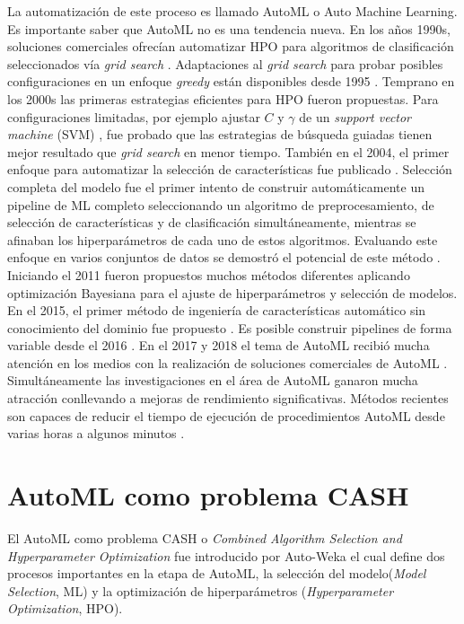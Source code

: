 La automatización de este proceso es llamado AutoML o Auto Machine Learning. Es importante saber que AutoML no es una tendencia nueva. En los años 1990s, soluciones comerciales ofrecían automatizar HPO para algoritmos de clasificación seleccionados vía \textit{grid search} \parencite{17}. Adaptaciones al \textit{grid search} para probar posibles configuraciones en un enfoque \textit{greedy} están disponibles desde 1995 \parencite{18}. Temprano en los 2000s las primeras estrategias eficientes para HPO fueron propuestas. Para configuraciones limitadas, por ejemplo ajustar $C$ y $\gamma$ de un \textit{support vector machine} (SVM) \parencite{19} \parencite{20}, fue probado que las estrategias de búsqueda guiadas tienen mejor resultado que \textit {grid search} en menor tiempo. También en el 2004, el primer enfoque para automatizar la selección de características fue publicado \parencite{21}. Selección completa del modelo \parencite{22} fue el primer intento de construir automáticamente un pipeline de ML completo seleccionando un algoritmo de preprocesamiento, de selección de características y de clasificación simultáneamente, mientras se afinaban los hiperparámetros de cada uno de estos algoritmos. Evaluando este enfoque en varios conjuntos de datos se demostró el potencial de este método \parencite{23}. Iniciando el 2011 fueron propuestos \parencite{13} muchos métodos diferentes aplicando optimización Bayesiana para el ajuste de hiperparámetros \parencite{24} \parencite{8} y selección de modelos. En el 2015, el primer método de ingeniería de características automático sin conocimiento del dominio fue propuesto \parencite{26}. Es posible construir pipelines de forma variable desde el 2016 \parencite{27}. En el 2017 y 2018 el tema de AutoML recibió mucha atención en los medios con la realización de soluciones comerciales de AutoML \parencite{28} \parencite{29} \parencite{30} \parencite{31}. Simultáneamente las investigaciones en el área de AutoML ganaron mucha atracción conllevando a mejoras de rendimiento significativas. Métodos recientes son capaces de reducir el tiempo de ejecución de procedimientos AutoML desde varias horas a algunos minutos \parencite{32}.

\section{AutoML como problema CASH}

El AutoML como problema CASH o \textit{Combined Algorithm Selection and Hyperparameter Optimization} fue introducido por Auto-Weka el cual define dos procesos importantes en la etapa de AutoML, la selección del modelo(\textit{Model Selection}, ML) y la optimización de hiperparámetros (\textit{Hyperparameter Optimization}, HPO).

